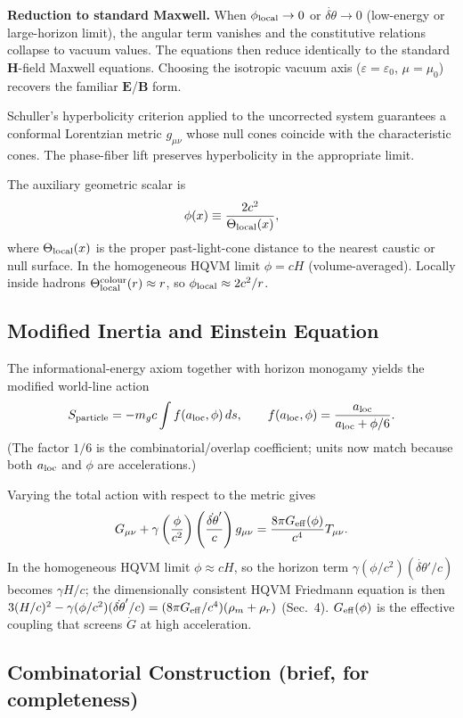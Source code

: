 \documentclass[12pt,a4paper]{article}
\begin{document}
\textbf{Reduction to standard Maxwell.} When $\phi_{\rm local}\to0$ or $\dot{\delta\theta}\to0$ (low-energy or large-horizon limit), the angular term vanishes and the constitutive relations collapse to vacuum values. The equations then reduce identically to the standard $\mathbf{H}$-field Maxwell equations. Choosing the isotropic vacuum axis ($\varepsilon=\varepsilon_0$, $\mu=\mu_0$) recovers the familiar $\mathbf{E}$/$\mathbf{B}$ form.

Schuller's hyperbolicity criterion applied to the uncorrected system guarantees a conformal Lorentzian metric $g_{\mu\nu}$ whose null cones coincide with the characteristic cones. The phase-fiber lift preserves hyperbolicity in the appropriate limit.

The auxiliary geometric scalar is
\[
\phi(x) \equiv \frac{2c^2}{\Theta_{\rm local}(x)},
\]
where $\Theta_{\rm local}(x)$ is the proper past-light-cone distance to the nearest caustic or null surface. In the homogeneous HQVM limit $\phi=cH$ (volume-averaged). Locally inside hadrons $\Theta_{\rm local}^{\rm colour}(r)\approx r$, so $\phi_{\rm local}\approx2c^2/r$.

\subsection{Modified Inertia and Einstein Equation}

The informational-energy axiom together with horizon monogamy yields the modified world-line action
\[
S_{\rm particle} = -m_g c \int f(a_{\rm loc},\phi)\,ds, \qquad
f(a_{\rm loc},\phi) = \frac{a_{\rm loc}}{a_{\rm loc} + \phi/6}.
\]
(The factor $1/6$ is the combinatorial/overlap coefficient; units now match because both $a_{\rm loc}$ and $\phi$ are accelerations.)

Varying the total action with respect to the metric gives
\[
G_{\mu\nu} + \gamma \left( \frac{\phi}{c^2} \right)\left( \frac{\dot{\delta\theta}'}{c} \right) g_{\mu\nu} = \frac{8\pi G_{\rm eff}(\phi)}{c^4} T_{\mu\nu}.
\]
In the homogeneous HQVM limit $\phi \approx c H$, so the horizon term $\gamma(\phi/c^2)(\dot{\delta\theta}'/c)$ becomes $\gamma H/c$; the dimensionally consistent HQVM Friedmann equation is then $3(H/c)^2 - \gamma(\phi/c^2)(\dot{\delta\theta}'/c) = (8\pi G_{\rm eff}/c^4)(\rho_m + \rho_r)$ (Sec.~4). $G_{\rm eff}(\phi)$ is the effective coupling that screens $\dot{G}$ at high acceleration.

\subsection{Combinatorial Construction (brief, for completeness)}
\end{document}
